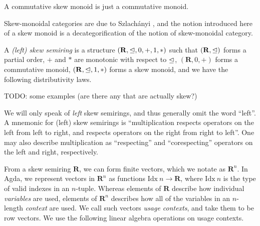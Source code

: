 \documentclass[submission,copyright,creativecommons]{eptcs}
\begin{document}
\begin{remark}
  A commutative skew monoid is just a commutative monoid.
\end{remark}

Skew-monoidal categories are due to Szlach\'anyi \cite{skew}, and the notion
introduced here of a skew monoid is a decategorification of the notion of
skew-monoidal category.

\begin{definition}
  A \emph{(left) skew semiring} is a structure
  $(\mathbf R, \trianglelefteq, 0, +, 1, *)$ such that $(\mathbf R, \trianglelefteq)$ forms a
  partial order, $+$ and $*$ are monotonic with respect to $\trianglelefteq$,
  $(\mathbf R, 0, +)$ forms a commutative monoid, $(\mathbf R, \trianglelefteq, 1, *)$
  forms a skew monoid, and we have the following distributivity laws.
\end{definition}

\begin{example}
  TODO: some examples (are there any that are actually skew?)
\end{example}

We will only speak of \emph{left} skew semirings, and thus generally
omit the word ``left''.  A mnemonic for (left) skew semirings is
``multiplication respects operators on the left from left to right,
and respects operators on the right from right to left''.  One may
also describe multiplication as ``respecting'' and ``corespecting''
operators on the left and right, respectively.

From a skew semiring $\mathbf R$, we can form finite vectors, which we
notate as $\mathbf R^n$. In Agda, we represent vectors in
$\mathbf R^n$ as functions $\mathrm{Idx}~n \to \mathbf{R}$, where
$\mathrm{Idx}~n$ is the type of valid indexes in an $n$-tuple.
Whereas elements of $\mathbf R$ describe how individual
\emph{variables} are used, elements of $\mathbf R^n$ describes how all
of the variables in an $n$-length \emph{context} are used. We call
such vectors \emph{usage contexts}, and take them to be row vectors.
We use the following linear algebra operations on usage contexts.
\end{document}
